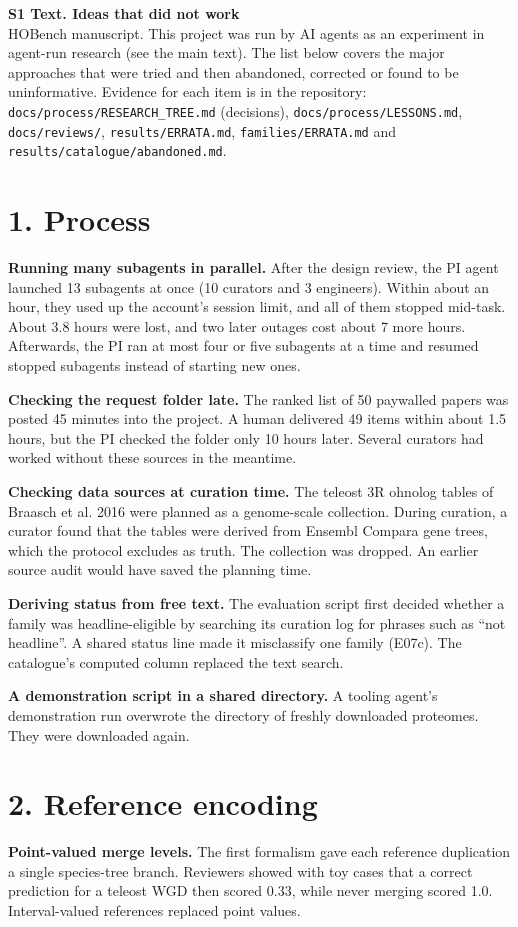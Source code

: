 \documentclass[10pt]{article}
\begin{document}
{\large\textbf{S1 Text. Ideas that did not work}}\\[2pt]
HOBench manuscript. This project was run by AI agents as an experiment in agent-run research (see the main text).
The list below covers the major approaches that were tried and then abandoned, corrected or found to be
uninformative. Evidence for each item is in the repository: \texttt{docs/process/RESEARCH\_TREE.md} (decisions),
\texttt{docs/process/LESSONS.md}, \texttt{docs/reviews/}, \texttt{results/ERRATA.md}, \texttt{families/ERRATA.md} and
\texttt{results/catalogue/abandoned.md}.

\section*{1. Process}
\textbf{Running many subagents in parallel.} After the design review, the PI agent launched 13 subagents at once
(10 curators and 3 engineers). Within about an hour, they used up the account's session limit, and all of them stopped
mid-task. About 3.8 hours were lost, and two later outages cost about 7 more hours. Afterwards, the PI ran at most
four or five subagents at a time and resumed stopped subagents instead of starting new ones.

\textbf{Checking the request folder late.} The ranked list of 50 paywalled papers was posted 45 minutes into the
project. A human delivered 49 items within about 1.5 hours, but the PI checked the folder only 10 hours later.
Several curators had worked without these sources in the meantime.

\textbf{Checking data sources at curation time.} The teleost 3R ohnolog tables of Braasch et al. 2016 were planned
as a genome-scale collection. During curation, a curator found that the tables were derived from Ensembl Compara gene
trees, which the protocol excludes as truth. The collection was dropped. An earlier source audit would have saved the
planning time.

\textbf{Deriving status from free text.} The evaluation script first decided whether a family was headline-eligible
by searching its curation log for phrases such as ``not headline''. A shared status line made it misclassify one
family (E07c). The catalogue's computed column replaced the text search.

\textbf{A demonstration script in a shared directory.} A tooling agent's demonstration run overwrote the directory of
freshly downloaded proteomes. They were downloaded again.

\section*{2. Reference encoding}
\textbf{Point-valued merge levels.} The first formalism gave each reference duplication a single species-tree branch.
Reviewers showed with toy cases that a correct prediction for a teleost WGD then scored 0.33, while never merging
scored 1.0. Interval-valued references replaced point values.
\end{document}
